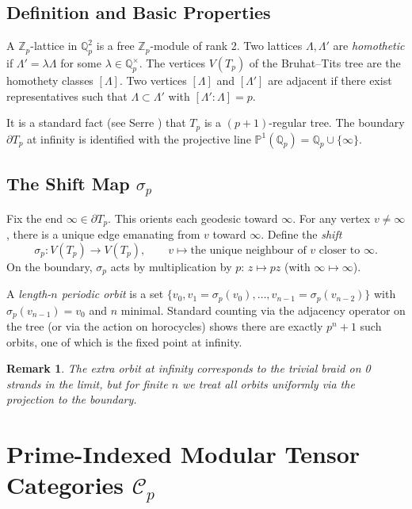 \documentclass[11pt,a4paper]{amsart}
\newtheorem{remark}[theorem]{Remark}
\begin{document}
\subsection{Definition and Basic Properties}

A \(\mathbb{Z}_p\)-lattice in \(\mathbb{Q}_p^2\) is a free \(\mathbb{Z}_p\)-module of rank 2. Two lattices \(\Lambda, \Lambda'\) are \emph{homothetic} if \(\Lambda' = \lambda \Lambda\) for some \(\lambda \in \mathbb{Q}_p^\times\). The vertices \(V(T_p)\) of the Bruhat--Tits tree are the homothety classes \([\Lambda]\). Two vertices \([\Lambda]\) and \([\Lambda']\) are adjacent if there exist representatives such that \(\Lambda \subset \Lambda'\) with \([\Lambda' : \Lambda] = p\).

It is a standard fact (see Serre \cite{SerreTrees}) that \(T_p\) is a \((p+1)\)-regular tree. The boundary \(\partial T_p\) at infinity is identified with the projective line \(\mathbb{P}^1(\mathbb{Q}_p) = \mathbb{Q}_p \cup \{\infty\}\).

\subsection{The Shift Map \(\sigma_p\)}
\label{subsec:shift}

Fix the end \(\infty \in \partial T_p\). This orients each geodesic toward \(\infty\). For any vertex \(v \neq \infty\), there is a unique edge emanating from \(v\) toward \(\infty\). Define the \emph{shift}
\[
\sigma_p : V(T_p) \to V(T_p), \qquad v \mapsto \text{the unique neighbour of } v \text{ closer to }\infty.
\]
On the boundary, \(\sigma_p\) acts by multiplication by \(p\): \(z \mapsto pz\) (with \(\infty \mapsto \infty\)).

A \emph{length-\(n\) periodic orbit} is a set \(\{v_0, v_1 = \sigma_p(v_0), \dots, v_{n-1} = \sigma_p(v_{n-2})\}\) with \(\sigma_p(v_{n-1}) = v_0\) and \(n\) minimal. Standard counting via the adjacency operator on the tree (or via the action on horocycles) shows there are exactly \(p^n + 1\) such orbits, one of which is the fixed point at infinity.

\begin{remark}
The extra orbit at infinity corresponds to the trivial braid on 0 strands in the limit, but for finite \(n\) we treat all orbits uniformly via the projection to the boundary.
\end{remark}

\section{Prime-Indexed Modular Tensor Categories \(\mathcal{C}_p\)}
\label{sec:mtc}
\end{document}
